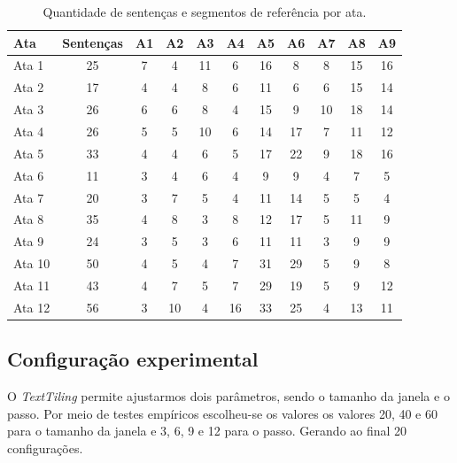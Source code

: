 \begin{table}[!h]
	\centering
	\begin{tabular}{|l|c|c|c|c|c|c|c|c|c|c|} \hline
		\textbf{Ata} & \textbf{Sentenças}  & 
		\textbf{A1}  & 
		\textbf{A2}  & 
		\textbf{A3}  & 
		\textbf{A4}  & 
		\textbf{A5}  & 
		\textbf{A6}  & 
		\textbf{A7}  & 
		\textbf{A8}  & 
		\textbf{A9} \\	\hline

		Ata 1  & 25 & 7  & 4  & 11 & 6  & 16 & 8  & 8  & 15 & 16 \\ \hline 
		Ata 2  & 17 & 4  & 4  & 8  & 6  & 11 & 6  & 6  & 15 & 14 \\ \hline 
		Ata 3  & 26 & 6  & 6  & 8  & 4  & 15 & 9  & 10 & 18 & 14 \\ \hline 
		Ata 4  & 26 & 5  & 5  & 10 & 6  & 14 & 17 & 7  & 11 & 12 \\ \hline 
		Ata 5  & 33 & 4  & 4  & 6  & 5  & 17 & 22 & 9  & 18 & 16 \\ \hline 
		Ata 6  & 11 & 3  & 4  & 6  & 4  & 9  & 9  & 4  & 7  &  5 \\ \hline 
		Ata 7  & 20 & 3  & 7  & 5  & 4  & 11 & 14 & 5  & 5  &  4 \\ \hline 
		Ata 8  & 35 & 4  & 8  & 3  & 8  & 12 & 17 & 5  & 11 &  9 \\ \hline 
		Ata 9  & 24 & 3  & 5  & 3  & 6  & 11 & 11 & 3  & 9  &  9 \\ \hline 
		Ata 10 & 50 & 4  & 5  & 4  & 7  & 31 & 29 & 5  & 9  &  8 \\ \hline 
		Ata 11 & 43 & 4  & 7  & 5  & 7  & 29 & 19 & 5  & 9  & 12 \\ \hline 
		Ata 12 & 56 & 3  & 10 & 4  & 16 & 33 & 25 & 4  & 13 & 11 \\ \hline 

	\end{tabular}
	\caption{Quantidade de sentenças e segmentos de referência por ata.}
	\label{tab:segmentacaoreferencia}
\end{table}






\subsection{Configuração experimental}
\label{subsec:configuracaoexperimental}

  

O \textit{TextTiling} permite ajustarmos dois parâmetros, sendo o tamanho da janela e o passo. Por meio de testes empíricos escolheu-se os valores os valores 20, 40 e 60 para o tamanho da janela e 3, 6, 9 e 12 para o passo. Gerando ao final 20 configurações.
%

